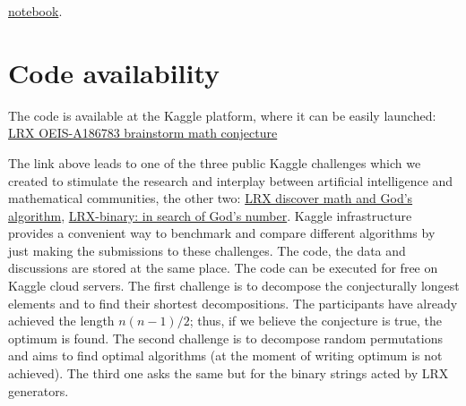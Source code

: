 \documentclass[reqno,11pt]{amsart}
\begin{document}
\href{https://www.kaggle.com/code/ogurtsov/gumbel-for-binary-puzzle}{notebook}. 



\section{Code availability}

The code is available at the Kaggle platform, where it can be easily launched:
\href{https://www.kaggle.com/competitions/lrx-oeis-a-186783-brainstorm-math-conjecture/code}{LRX OEIS-A186783 brainstorm math conjecture}

The link above leads to one of the three public Kaggle challenges which we created to stimulate the research and interplay between artificial intelligence and mathematical communities, the other two:
\href{https://www.kaggle.com/competitions/lrx-binary-in-search-of-gods-number}{LRX discover math and God's algorithm}, \href{https://www.kaggle.com/competitions/lrx-discover-math-gods-algorithm}{LRX-binary: in search of God's number}. Kaggle infrastructure provides a convenient way to benchmark and compare different algorithms by just making the submissions to these challenges. The code, the data and discussions are stored at the same place. The code can be executed for free on Kaggle cloud servers. The first challenge is to decompose the conjecturally longest elements and to find their shortest decompositions. The participants have already achieved the length $n(n-1)/2$; thus, if we believe the conjecture is true, the optimum is found. The second challenge is to decompose random permutations and aims to find optimal algorithms (at the moment of writing optimum is not achieved). The third one asks the same but for the binary strings acted by LRX generators. 


\end{document}
